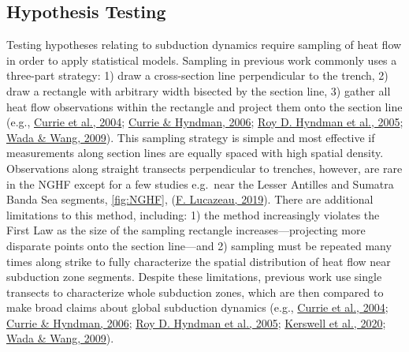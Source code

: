 \documentclass[draft,linenumbers]{agujournal2018}
\begin{document}
\subsection{Hypothesis Testing}

Testing hypotheses relating to subduction dynamics require sampling of
heat flow in order to apply statistical models. Sampling in previous
work commonly uses a three-part strategy: 1) draw a cross-section line
perpendicular to the trench, 2) draw a rectangle with arbitrary width
bisected by the section line, 3) gather all heat flow observations
within the rectangle and project them onto the section line (e.g.,
\protect\hyperlink{ref-currie2004}{Currie et al., 2004};
\protect\hyperlink{ref-currie2006}{Currie \& Hyndman, 2006};
\protect\hyperlink{ref-hyndman2005}{Roy D. Hyndman et al., 2005};
\protect\hyperlink{ref-wada2009}{Wada \& Wang, 2009}). This sampling
strategy is simple and most effective if measurements along section
lines are equally spaced with high spatial density. Observations along
straight transects perpendicular to trenches, however, are rare in the
NGHF except for a few studies e.g.~near the Lesser Antilles and Sumatra
Banda Sea segments, \ref{fig:NGHF},
(\protect\hyperlink{ref-lucazeau2019}{F. Lucazeau, 2019}). There are
additional limitations to this method, including: 1) the method
increasingly violates the First Law as the size of the sampling
rectangle increases---projecting more disparate points onto the section
line---and 2) sampling must be repeated many times along strike to fully
characterize the spatial distribution of heat flow near subduction zone
segments. Despite these limitations, previous work use single transects
to characterize whole subduction zones, which are then compared to make
broad claims about global subduction dynamics (e.g.,
\protect\hyperlink{ref-currie2004}{Currie et al., 2004};
\protect\hyperlink{ref-currie2006}{Currie \& Hyndman, 2006};
\protect\hyperlink{ref-hyndman2005}{Roy D. Hyndman et al., 2005};
\protect\hyperlink{ref-kerswell2020}{Kerswell et al., 2020};
\protect\hyperlink{ref-wada2009}{Wada \& Wang, 2009}).
\end{document}
